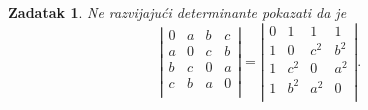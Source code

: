 \documentclass{article}
\newtheorem{theorem}{\textbf{Zadatak}}
\begin{document}
\begin{theorem}
    Ne razvijaju\' ci determinante pokazati da je
    \begin{equation}
        \label{eq:1}
        \left|
        \begin{array}{cccc}
            0 & a & b & c \\
            a & 0 & c & b \\
            b & c & 0 & a \\
            c & b & a & 0 \\
        \end{array}
        \right|=\left|
        \begin{array}{cccc}
            0 & 1 & 1 & 1 \\
            1 & 0 & c^2 & b^2 \\
            1 & c^2 & 0 & a^2 \\
            1 & b^2 & a^2 & 0 \\
        \end{array}
        \right|.
    \end{equation}
\end{theorem}
\end{document}
